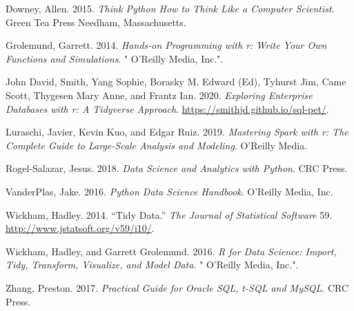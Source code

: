 \documentclass[
  letterpaper,
  DIV=11,
  numbers=noendperiod]{scrreprt}
\newlength{\cslhangindent}
\newlength{\cslentryspacingunit} %
\newenvironment{CSLReferences}[2] %
 {%
  \setlength{\parindent}{0pt}
  \ifodd #1
  \let\oldpar\par
  \def\par{\hangindent=\cslhangindent\oldpar}
  \fi
  \setlength{\parskip}{#2\cslentryspacingunit}
 }%
 {}
\begin{document}

\hypertarget{refs}{}
\begin{CSLReferences}{1}{0}
\leavevmode{}%
Downey, Allen. 2015. \emph{Think Python How to Think Like a Computer
Scientist}. Green Tea Press Needham, Massachusetts.

\leavevmode{}%
Grolemund, Garrett. 2014. \emph{Hands-on Programming with r: Write Your
Own Functions and Simulations}. " O'Reilly Media, Inc.".

\leavevmode{}%
John David, Smith, Yang Sophie, Borasky M. Edward (Ed), Tyhurst Jim,
Came Scott, Thygesen Mary Anne, and Frantz Ian. 2020. \emph{Exploring
Enterprise Databases with r: A Tidyverse Approach}.
\url{https://smithjd.github.io/sql-pet/}.

\leavevmode{}%
Luraschi, Javier, Kevin Kuo, and Edgar Ruiz. 2019. \emph{Mastering Spark
with r: The Complete Guide to Large-Scale Analysis and Modeling}.
O'Reilly Media.

\leavevmode{}%
Rogel-Salazar, Jesus. 2018. \emph{Data Science and Analytics with
Python}. CRC Press.

\leavevmode{}%
VanderPlas, Jake. 2016. \emph{Python Data Science Handbook}. O'Reilly
Media, Inc.

\leavevmode{}%
Wickham, Hadley. 2014. {``Tidy Data.''} \emph{The Journal of Statistical
Software} 59. \url{http://www.jstatsoft.org/v59/i10/}.

\leavevmode{}%
Wickham, Hadley, and Garrett Grolemund. 2016. \emph{R for Data Science:
Import, Tidy, Transform, Visualize, and Model Data}. " O'Reilly Media,
Inc.".

\leavevmode{}%
Zhang, Preston. 2017. \emph{Practical Guide for Oracle SQL, t-SQL and
MySQL}. CRC Press.

\end{CSLReferences}
\end{document}
